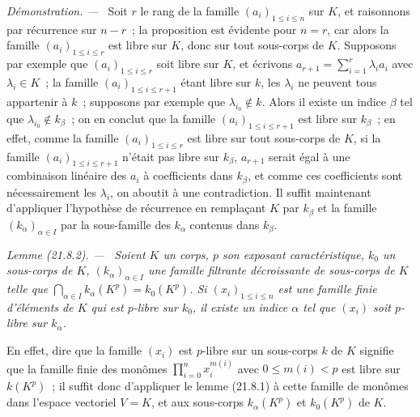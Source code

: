 \documentclass[10pt,oneside]{book}
\makeatletter
\newcommand{\setmanualcurrentlabel}[1]{\def\@currentlabel{#1}}
\newcommand{\oldpage}[2][]{%
  \setcounter{footnote}{0}%
  \marginpar{\scriptsize\textbf{#1}~|~#2}\ignorespaces}
\newenvironment{lemma}[1][]{%
  \setmanualcurrentlabel{#1}\par\medskip\noindent\itshape Lemme (#1). ---\ }{\par}
\newenvironment{proof}{%
  \par\medskip\noindent\textit{Démonstration. ---\ }}{\par}
\makeatother
\begin{document}
\oldpage[0\textsubscript{IV-1}]{172}
\begin{proof}
Soit $r$ le rang de la famille $(a_i)_{1\leqslant i\leqslant n}$ sur $K$, et
raisonnons par récurrence sur $n-r$~; la proposition est évidente pour $n=r$,
car alors la famille $(a_i)_{1\leqslant i\leqslant r}$ est libre sur $K$, donc
sur tout sous-corps de $K$. Supposons par exemple que
$(a_i)_{1\leqslant i\leqslant r}$ soit libre sur $K$, et écrivons
$a_{r+1}=\sum_{i=1}^r\lambda_i a_i$ avec $\lambda_i\in K$~; la famille
$(a_i)_{1\leqslant i\leqslant r+1}$ étant libre sur $k$, les $\lambda_i$ ne
peuvent tous appartenir à $k$~; supposons par exemple que
$\lambda_{i_0}\notin k$. Alors il existe un indice $\beta$ tel que
$\lambda_{i_0}\notin k_\beta$~; on en conclut que la famille $(a_i)_{1\leqslant i\leqslant r+1}$ est libre sur $k_\beta$~; en effet, comme la
famille $(a_i)_{1\leqslant i\leqslant r}$ est libre sur tout sous-corps de
$K$, si la famille $(a_i)_{1\leqslant i\leqslant r+1}$ n'était pas libre sur
$k_\beta$, $a_{r+1}$ serait égal à une combinaison linéaire des $a_i$ à
coefficients dans $k_\beta$, et comme ces coefficients sont nécessairement
les $\lambda_i$, on aboutit à une contradiction. Il suffit maintenant
d'appliquer l'hypothèse de récurrence en remplaçant $K$ par $k_\beta$ et la
famille $(k_\alpha)_{\alpha\in I}$ par la sous-famille des $k_\alpha$
contenus dans $k_\beta$.
\end{proof}

\begin{lemma}[21.8.2]
\label{0.21.8.2-fr}
Soient $K$ un corps, $p$ son exposant caractéristique, $k_0$ un sous-corps de
$K$, $(k_\alpha)_{\alpha\in I}$ une famille filtrante décroissante de
sous-corps de $K$ telle que $\bigcap_{\alpha\in I}k_\alpha(K^p)=k_0(K^p)$.
Si $(x_i)_{1\leqslant i\leqslant n}$ est une famille finie d'éléments de $K$
qui est $p$-libre sur $k_0$, il existe un indice $\alpha$ tel que $(x_i)$ soit
$p$-libre sur $k_\alpha$.

En effet, dire que la famille $(x_i)$ est $p$-libre sur un sous-corps $k$
de $K$ signifie que la famille finie des monômes
$\prod_{i=0}^n x_i^{m(i)}$ avec $0\leqslant m(i)<p$ est libre sur $k(K^p)$~;
il suffit donc d'appliquer le lemme (21.8.1) à cette famille de monômes dans
l'espace vectoriel $V=K$, et aux sous-corps $k_\alpha(K^p)$ et $k_0(K^p)$
de $K$.
\end{lemma}
\end{document}
